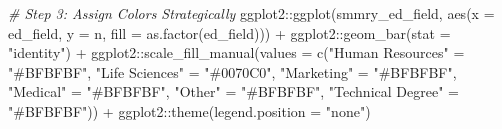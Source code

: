\documentclass[
]{book}
\newenvironment{Shaded}{\begin{snugshade}}{\end{snugshade}}
\newcommand{\AttributeTok}[1]{\textcolor[rgb]{0.77,0.63,0.00}{#1}}
\newcommand{\CommentTok}[1]{\textcolor[rgb]{0.56,0.35,0.01}{\textit{#1}}}
\newcommand{\FunctionTok}[1]{\textcolor[rgb]{0.00,0.00,0.00}{#1}}
\newcommand{\NormalTok}[1]{#1}
\newcommand{\OtherTok}[1]{\textcolor[rgb]{0.56,0.35,0.01}{#1}}
\newcommand{\SpecialCharTok}[1]{\textcolor[rgb]{0.00,0.00,0.00}{#1}}
\newcommand{\StringTok}[1]{\textcolor[rgb]{0.31,0.60,0.02}{#1}}
\begin{document}
\begin{Shaded}
\begin{Highlighting}[]
\CommentTok{\# Step 3: Assign Colors Strategically}
\NormalTok{ggplot2}\SpecialCharTok{::}\FunctionTok{ggplot}\NormalTok{(smmry\_ed\_field, }\FunctionTok{aes}\NormalTok{(}\AttributeTok{x =}\NormalTok{ ed\_field, }\AttributeTok{y =}\NormalTok{ n, }\AttributeTok{fill =} \FunctionTok{as.factor}\NormalTok{(ed\_field))) }\SpecialCharTok{+}
\NormalTok{ggplot2}\SpecialCharTok{::}\FunctionTok{geom\_bar}\NormalTok{(}\AttributeTok{stat =} \StringTok{"identity"}\NormalTok{) }\SpecialCharTok{+}
\NormalTok{ggplot2}\SpecialCharTok{::}\FunctionTok{scale\_fill\_manual}\NormalTok{(}\AttributeTok{values =} \FunctionTok{c}\NormalTok{(}\StringTok{"Human Resources"} \OtherTok{=} \StringTok{"\#BFBFBF"}\NormalTok{, }
                                      \StringTok{"Life Sciences"} \OtherTok{=} \StringTok{"\#0070C0"}\NormalTok{, }
                                      \StringTok{"Marketing"} \OtherTok{=} \StringTok{"\#BFBFBF"}\NormalTok{, }
                                      \StringTok{"Medical"} \OtherTok{=} \StringTok{"\#BFBFBF"}\NormalTok{,}
                                      \StringTok{"Other"} \OtherTok{=} \StringTok{"\#BFBFBF"}\NormalTok{,}
                                      \StringTok{"Technical Degree"} \OtherTok{=} \StringTok{"\#BFBFBF"}\NormalTok{)) }\SpecialCharTok{+}
\NormalTok{ggplot2}\SpecialCharTok{::}\FunctionTok{theme}\NormalTok{(}\AttributeTok{legend.position =} \StringTok{"none"}\NormalTok{)}


\end{Highlighting}
\end{Shaded}
\end{document}
